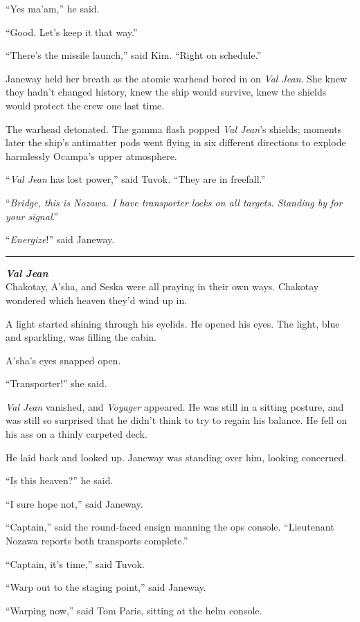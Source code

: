\documentclass[twoside,letterpaper,12pt]{memoir}
\begin{document}
``Yes ma'am,'' he said. 

``Good. Let's keep it that way.'' 

``There's the missile launch,'' said Kim. ``Right on schedule.'' 

Janeway held her breath as the atomic warhead bored in on \textit{Val Jean}. She knew they hadn't changed history, knew the ship would survive, knew the shields would protect the crew one last time. 

The warhead detonated. The gamma flash popped \textit{Val Jean}'s shields; moments later the ship's antimatter pods went flying in six different directions to explode harmlessly Ocampa's upper atmosphere. 

``\textit{Val Jean} has lost power,'' said Tuvok. ``They are in freefall.'' 

``\textit{Bridge, this is Nozawa. I have transporter locks on all targets. Standing by for your signal}.'' 

``\textit{Energize}!'' said Janeway. 

\fancybreak{\rule{3cm}{0.4 pt}} 

\noindent\textit{\textbf{Val Jean}}\\

Chakotay, A'sha, and Seska were all praying in their own ways. Chakotay wondered which heaven they'd wind up in. 

A light started shining through his eyelids. He opened his eyes. The light, blue and sparkling, was filling the cabin. 

A'sha's eyes snapped open. 

``Transporter!'' she said. 

\textit{Val Jean} vanished, and \textit{Voyager} appeared. He was still in a sitting posture, and was still so surprised that he didn't think to try to regain his balance. He fell on his ass on a thinly carpeted deck. 

He laid back and looked up. Janeway was standing over him, looking concerned. 

``Is this heaven?'' he said. 

``I sure hope not,'' said Janeway. 

``Captain,'' said the round-faced ensign manning the ops console. ``Lieutenant Nozawa reports both transports complete.'' 

``Captain, it's time,'' said Tuvok. 

``Warp out to the staging point,'' said Janeway. 

``Warping now,'' said Tom Paris, sitting at the helm console. 
\end{document}
